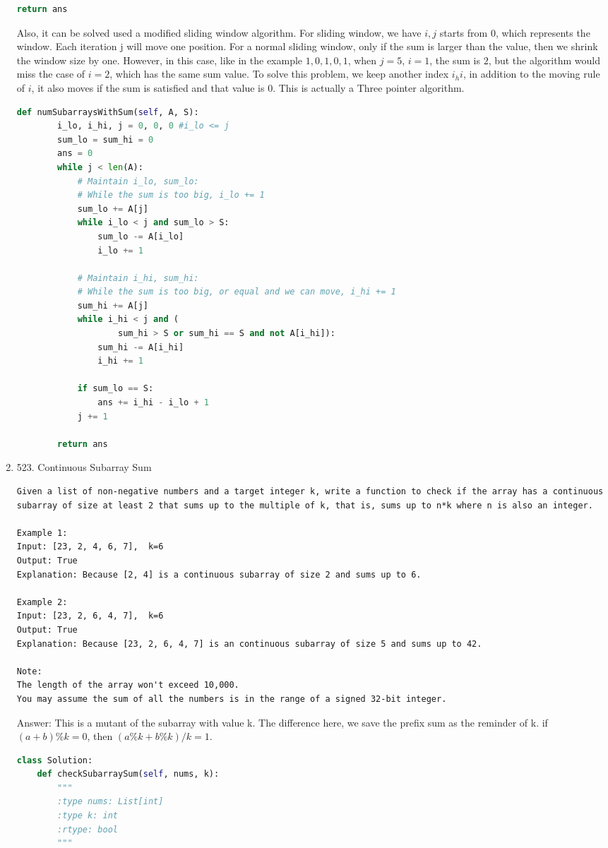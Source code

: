 \documentclass[../main.tex]{subfiles}
\begin{document}
\begin{enumerate}
\begin{lstlisting}[language=Python]
        return ans
\end{lstlisting}
Also, it can be solved used a modified sliding window algorithm. For sliding window, we have $i,j$ starts from 0, which represents the window. Each iteration j will move one position. For a normal sliding window, only if the sum is larger than the value, then we shrink the window size by one. However, in this case, like in the example $1, 0, 1, 0, 1$, when $j = 5$, $i = 1$, the sum is $2$, but the algorithm would miss the case of $i = 2$, which has the same sum value. To solve this problem, we keep another index $i_hi$, in addition to the moving rule of $i$, it also moves if the sum is satisfied and that value is $0$. This is actually a Three pointer algorithm. 
\begin{lstlisting}[language=Python]
    def numSubarraysWithSum(self, A, S):
        i_lo, i_hi, j = 0, 0, 0 #i_lo <= j
        sum_lo = sum_hi = 0
        ans = 0
        while j < len(A):
            # Maintain i_lo, sum_lo:
            # While the sum is too big, i_lo += 1
            sum_lo += A[j]
            while i_lo < j and sum_lo > S:
                sum_lo -= A[i_lo]
                i_lo += 1

            # Maintain i_hi, sum_hi:
            # While the sum is too big, or equal and we can move, i_hi += 1
            sum_hi += A[j]
            while i_hi < j and (
                    sum_hi > S or sum_hi == S and not A[i_hi]):
                sum_hi -= A[i_hi]
                i_hi += 1

            if sum_lo == S:
                ans += i_hi - i_lo + 1
            j += 1

        return ans
\end{lstlisting}
\item 523. Continuous Subarray Sum
\begin{lstlisting}
Given a list of non-negative numbers and a target integer k, write a function to check if the array has a continuous subarray of size at least 2 that sums up to the multiple of k, that is, sums up to n*k where n is also an integer.

Example 1:
Input: [23, 2, 4, 6, 7],  k=6
Output: True
Explanation: Because [2, 4] is a continuous subarray of size 2 and sums up to 6.

Example 2:
Input: [23, 2, 6, 4, 7],  k=6
Output: True
Explanation: Because [23, 2, 6, 4, 7] is an continuous subarray of size 5 and sums up to 42.

Note:
The length of the array won't exceed 10,000.
You may assume the sum of all the numbers is in the range of a signed 32-bit integer.
\end{lstlisting}
Answer: This is a mutant of the subarray with value k. The difference here, we save the prefix sum as the reminder of k. if $(a+b)\%k=0$, then $(a\%k+b\%k)/k=1$.
\begin{lstlisting}[language=Python]
class Solution:
    def checkSubarraySum(self, nums, k):
        """
        :type nums: List[int]
        :type k: int
        :rtype: bool
        """
        

\end{lstlisting}
\end{enumerate}
\end{document}
